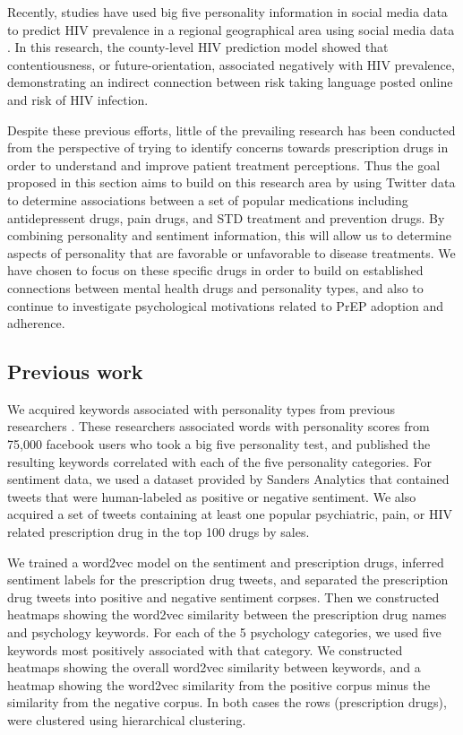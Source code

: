Recently, studies have used big five personality information in social media data to predict HIV prevalence in a regional geographical area using social media data \cite{ireland2015future}. In this research, the county-level HIV prediction model showed that contentiousness, or future-orientation, associated negatively with HIV prevalence, demonstrating an indirect connection between risk taking language posted online and risk of HIV infection.

Despite these previous efforts, little of the prevailing research has been conducted from the perspective of trying to identify concerns towards prescription drugs in order to understand and improve patient treatment perceptions. Thus the goal proposed in this section aims to build on this research area by using Twitter data to determine associations between a set of popular medications including antidepressent drugs, pain drugs, and STD treatment and prevention drugs. By combining personality and sentiment information, this will allow us to determine aspects of personality that are favorable or unfavorable to disease treatments. We have chosen to focus on these specific drugs in order to build on established connections between mental health drugs and personality types, and also to continue to investigate psychological motivations related to PrEP adoption and adherence.

\subsection{Previous work}

We acquired keywords associated with personality types from previous researchers \cite{schwartz2013toward}. These researchers associated words with personality scores from 75,000 facebook users who took a big five personality test, and published the resulting keywords correlated with each of the five personality categories. For sentiment data, we used a dataset provided by Sanders Analytics that contained tweets that were human-labeled as positive or negative sentiment. We also acquired a set of tweets containing at least one popular psychiatric, pain, or HIV related prescription drug in the top 100 drugs by sales.

We trained a word2vec model on the sentiment and prescription drugs, inferred sentiment labels for the prescription drug tweets, and separated the prescription drug tweets into positive and negative sentiment corpses. Then we constructed heatmaps showing the word2vec similarity between the prescription drug names and psychology keywords. For each of the 5 psychology categories, we used five keywords most positively associated with that category. We constructed heatmaps showing the overall word2vec similarity between keywords, and a heatmap showing the word2vec similarity from the positive corpus minus the similarity from the negative corpus. In both cases the rows (prescription drugs), were clustered using hierarchical clustering. 

